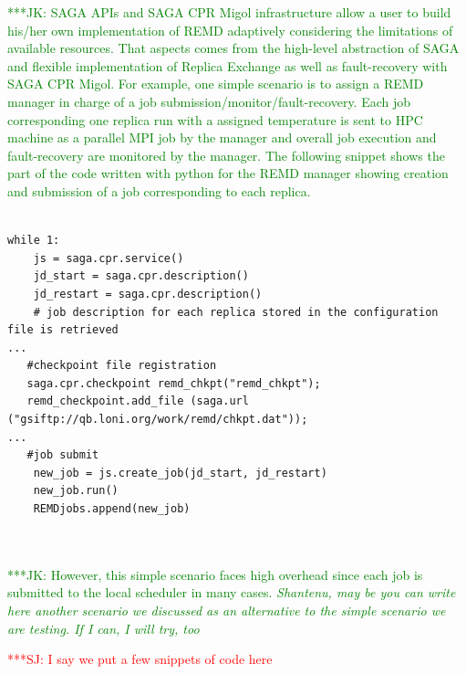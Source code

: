 \documentclass[times, 10pt,twocolumn]{article}
\newcommand{\kimnote}[1]{ {\textcolor{green} { ***JK: #1 }}}
\newcommand{\jhanote}[1]{ {\textcolor{red} { ***SJ: #1 }}}
\begin{document}
\kimnote{SAGA APIs and SAGA CPR Migol infrastructure allow a user to build his/her own implementation of REMD adaptively considering the limitations of available resources.  That aspects comes from the high-level abstraction of SAGA and flexible implementation of Replica Exchange as well as fault-recovery with SAGA CPR Migol.  For example, one simple scenario is to assign a REMD manager in charge of a job submission/monitor/fault-recovery.  Each job corresponding one replica run with a assigned temperature is sent to HPC machine as a parallel MPI job by the manager and overall job execution and fault-recovery are monitored by the manager.  The following snippet shows the part of the code written with python for the REMD manager showing creation and submission of a job corresponding to each replica.  }

\begin{lstlisting}[style=myListing, caption={Python snippets: Register Checkpoint with Migol}, 
label={lst:python_saga_chkpt_reg}]

while 1:
    js = saga.cpr.service() 
    jd_start = saga.cpr.description()
    jd_restart = saga.cpr.description()
    # job description for each replica stored in the configuration file is retrieved
...
   #checkpoint file registration
   saga.cpr.checkpoint remd_chkpt("remd_chkpt");
   remd_checkpoint.add_file (saga.url ("gsiftp://qb.loni.org/work/remd/chkpt.dat"));
...   
   #job submit
    new_job = js.create_job(jd_start, jd_restart)
    new_job.run()
    REMDjobs.append(new_job)
    


\end{lstlisting}

\kimnote{However, this simple scenario faces high overhead since each job is submitted to the local scheduler in many cases. \it Shantenu, may be you can write here another scenario we discussed as an alternative to the simple scenario we are testing.  If I can, I will try, too } 



\jhanote{I say we put a few snippets of code here}

\label{sec:exp}       
\end{document}
